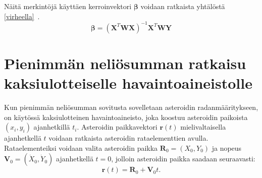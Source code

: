 \documentclass[12pt,a4paper,titlepage]{article}
\newcommand{\matr}[1]{\bm{#1}}
\newcommand{\transpose}[1]{{#1}^T}
\begin{document}
Näitä merkintöjä käyttäen kerroinvektori $\matr{\beta}$ voidaan ratkaista yhtälöstä \ref{virheella}~\cite{basicideas}.
\begin{equation}\label{virheella}
	\matr{\beta} = (\transpose{\matr{X}}\matr{W}\matr{X})^{-1}\transpose{\matr{X}}\matr{W}\matr{Y}
\end{equation}

\section{Pienimmän neliösumman ratkaisu kaksiulotteiselle havaintoaineistolle} \label{2d}
Kun pienimmän neliösumman sovitusta sovelletaan asteroidin radanmääritykseen, on käytössä kaksiulotteinen havaintoaineisto, joka koostuu asteroidin paikoista $(x_i, y_i)$ ajanhetkillä $t_i$. Asteroidin paikkavektori $\matr{r}(t)$ mielivaltaisella ajanhetkellä $t$ voidaan ratkaista asteroidin rataelementtien avulla. Rataelementeiksi voidaan valita asteroidin paikka $\matr{R}_0 = (X_0, Y_0)$ ja nopeus $\matr{V}_0 = (\dot{X}_0, \dot{Y}_0)$ ajanhetkellä $t = 0$, jolloin asteroidin paikka saadaan seuraavasti:
\begin{equation} \label{r(t)}
	\matr{r}(t) = \matr{R}_0 + \matr{V}_0t.
\end{equation}	
	
\end{document}
